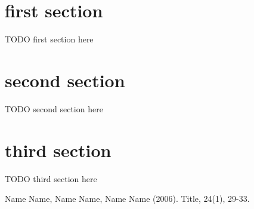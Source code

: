 \documentclass[journal]{IEEEtran}
\begin{document}
\section{first section}
TODO first section here


\section{second section}
TODO second section here


\section{third section}
TODO third section here


\begin{thebibliography}{1}

\bibitem{}
Name Name, Name Name, Name Name (2006). Title, 24(1), 29-33.

\end{thebibliography}
\end{document}
